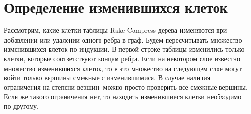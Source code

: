 \section{Определение изменившихся клеток}
\label{sec:changed}
Рассмотрим, какие клетки таблицы Rake-Compress дерева изменяются при добавлении или удалении одного ребра в граф. 
Будем пересчитывать множество изменившихся клеток по индукции.
В первой строке таблицы изменились только клетки, которые соответствуют концам ребра.  
Если на некотором слое известно множество изменившихся клеток, то в это множество на следующем слое могут войти только вершины смежные с изменившимися.
В случае наличия ограничения на степени вершин, можно просто проверить все смежные вершины. Если же такого ограничения нет, то находить изменившиеся клетки необходимо по-другому.




\FloatBarrier
